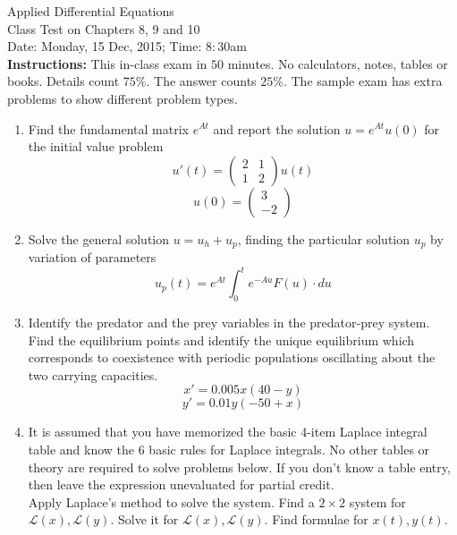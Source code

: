 \documentclass[11pt]{article}
\begin{document}
\begin{center}
{\huge Applied Differential Equations\\Class Test on Chapters 8, 9 and 10\\{\footnotesize Date: Monday, 15 Dec, 2015; Time: $8:30$am\\}}
{\footnotesize \textbf{Instructions:} This in-class exam in $50$ minutes. No calculators, notes, tables or books. Details count $75\%$. The answer counts $25\%$. The sample exam has extra problems to show different problem types.}
\end{center}
\vspace{0.6cm}
\begin{enumerate}
	\item Find the fundamental matrix $e^{At}$ and  report the solution $u=e^{At}u(0)$ for the initial value problem
	$$ u'(t)=\begin{pmatrix}
	2 & 1\\
	1 & 2
\end{pmatrix} u(t)$$
$$ u(0)=\begin{pmatrix}
3\\
-2
\end{pmatrix} $$
	\item Solve the general solution $u=u_h+u_p$, finding the particular solution $u_p$ by variation of parameters $$ u_p(t)=e^{At}\int_{0}^{t}e^{-Au}F(u)\cdot du $$
	\item Identify the predator and the prey variables in the predator-prey system. Find the equilibrium points and identify the unique equilibrium which corresponds to coexistence with periodic populations oscillating about the two carrying capacities.
	\begin{equation}
		x'=0.005x(40-y)
	\end{equation}
	\begin{equation}
		y'=0.01y(-50+x)
	\end{equation}
	\item It is assumed that you have memorized the basic 4-item Laplace integral table and know the 6 basic rules for Laplace integrals. No other tables or theory are required to solve problems below. If you don't know a table entry, then leave the expression unevaluated for partial credit.\\
	Apply Laplace's method to solve the system. Find a $2\times 2$ system for $\mathcal{L}(x), \mathcal{L}(y)$. Solve it for $\mathcal{L}(x), \mathcal{L}(y)$. Find formulae for $x(t), y(t)$.
\end{enumerate}
\end{document}
